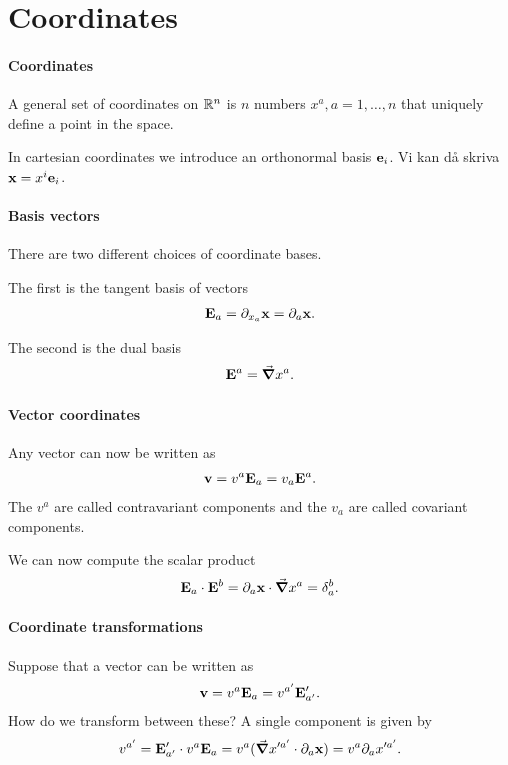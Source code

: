 \section{Coordinates}

\paragraph{Coordinates}
A general set of coordinates on $\mathbb{R}^{n}$ is $n$ numbers $x^{a}, a = 1, \dots, n$ that uniquely define a point in the space.

In cartesian coordinates we introduce an orthonormal basis $\vb{e}_{i}$. Vi kan då skriva $\vb{x} = x^{i}\vb{e}_{i}$.

\paragraph{Basis vectors}
There are two different choices of coordinate bases.

The first is the tangent basis of vectors
\begin{align*}
	\vb{E}_{a} = \partial_{x_{a}}\vb{x} = \partial_{a}\vb{x}.
\end{align*}

The second is the dual basis
\begin{align*}
	\vb{E}^{a} = \grad{x^{a}}.
\end{align*}

\paragraph{Vector coordinates}
Any vector can now be written as
\begin{align*}
	\vb{v} = v^{a}\vb{E}_{a} = v_{a}\vb{E}^{a}.
\end{align*}
The $v^{a}$ are called contravariant components and the $v_{a}$ are called covariant components.

We can now compute the scalar product
\begin{align*}
	\vb{E}_{a}\cdot\vb{E}^{b} = \partial_{a}\vb{x}\cdot\grad{x^{a}} = \delta_{a}^{b}.
\end{align*}

\paragraph{Coordinate transformations}
Suppose that a vector can be written as
\begin{align*}
	\vb{v} = v^{a}\vb{E}_{a} = v^{a'}\vb{E}_{a'}'.
\end{align*}
How do we transform between these? A single component is given by
\begin{align*}
	v^{a'} = \vb{E}_{a'}'\cdot v^{a}\vb{E}_{a} = v^{a}(\grad{x'^{a'}}\cdot\partial_{a}\vb{x}) = v^{a}\partial_{a}x'^{a'}.
\end{align*}

